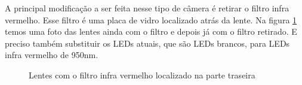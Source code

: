 A principal modificação a ser feita nesse tipo de câmera é retirar o filtro infra vermelho. Esse filtro é uma placa de vidro localizado atrás da lente. Na figura \ref{fig:camera_02} temos uma foto das lentes ainda com o filtro e depois já com o filtro retirado. E preciso também substituir os LEDs atuais, que são LEDs brancos, para LEDs infra vermelho de 950nm.

\begin{figure}[ht!]
\centering
{}
  \caption{Lentes com o filtro infra vermelho localizado na parte traseira}
  \label{fig:camera_02}
\end{figure}


